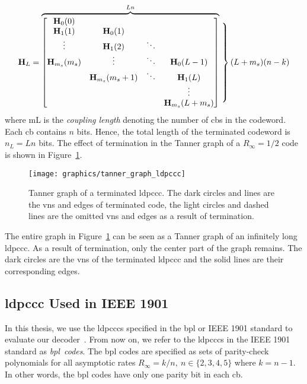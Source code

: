 \begin{align}
\mathbf{H}_L = 
\overbrace{\begin{bmatrix}
  \mathbf{H}_{0}(0)\\
  \mathbf{H}_1(1) &\mathbf{H}_0(1)\\
  \vdots &\mathbf{H}_1(2) &\ddots\\
  \mathbf{H}_{m_s}(m_s) &\vdots &\ddots &\mathbf{H}_0(L-1)\\
  &\mathbf{H}_{m_s}(m_s+1) &\ddots &\mathbf{H}_{1}(L)\\
  & & &\vdots\\
  & & &\mathbf{H}_{m_s}(L+m_s)
\end{bmatrix}}^{Ln}
\left.\begin{matrix}
\\
\\
\\
\\
\\
\\
\\
\\
\end{matrix}\right\}(L+m_s)(n-k)
\end{align}
where \gls{mL} is the \emph{coupling length} denoting the number of \glspl{cb} in the codeword. Each \gls{cb} contains $n$ bits. Hence, the total length of the terminated codeword is $n_L=Ln$ bits. The effect of termination in the Tanner graph of a $R_\infty=1/2$ code is shown in Figure~\ref{fig:tannGraphLdpccc}.
\begin{figure}[htbp]
  \centering
  \texttt{[image: graphics/tanner\_graph\_ldpccc]}
  \caption{Tanner graph of a terminated \gls{ldpccc}. The dark circles and lines are the \glspl{vn} and edges of terminated code, the light circles and dashed lines are the omitted \glspl{vn} and edges as a result of termination.}
  \label{fig:tannGraphLdpccc}
\end{figure}
The entire graph in Figure~\ref{fig:tannGraphLdpccc} can be seen as a Tanner graph of an infinitely long \gls{ldpccc}. As a result of termination, only the center part of the graph remains. The dark circles are the \glspl{vn} of the terminated \gls{ldpccc} and the solid lines are their corresponding edges.

\subsection{\acrlong{ldpccc} Used in IEEE 1901}\label{sec:bpl_bg}
In this thesis, we use the \glspl{ldpccc} specified in the \gls{bpl} or IEEE 1901 standard to evaluate our decoder~\cite{Bpl}. From now on, we refer to the \glspl{ldpccc} in the IEEE 1901 standard as \emph{\gls{bpl}~codes}. The \gls{bpl} codes are specified as sets of parity-check polynomials for all asymptotic rates $R_\infty=k/n,\ n\in\{2,3,4,5\}$ where $k=n-1$. In other words, the \gls{bpl} codes have only one parity bit in each \gls{cb}. 

